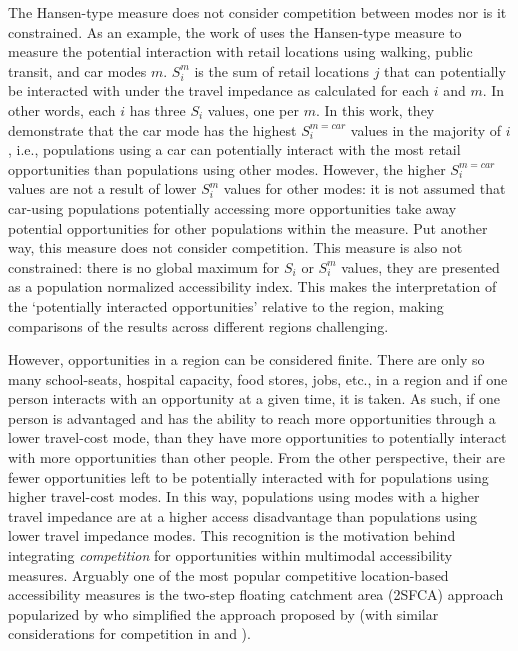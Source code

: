 \documentclass[numbered]{trbunofficial}
\begin{document}
The Hansen-type measure does not consider competition between modes nor
is it constrained. As an example, the work of
\citet{tahmasbiMultimodalAccessibilitybasedEquity2019} uses the
Hansen-type measure to measure the potential interaction with retail
locations using walking, public transit, and car modes \(m\). \(S_i^m\)
is the sum of retail locations \(j\) that can potentially be interacted
with under the travel impedance as calculated for each \(i\) and \(m\).
In other words, each \(i\) has three \(S_i\) values, one per \(m\). In
this work, they demonstrate that the car mode has the highest
\(S_i^{m=car}\) values in the majority of \(i\), i.e., populations using
a car can potentially interact with the most retail opportunities than
populations using other modes. However, the higher \(S_i^{m=car}\)
values are not a result of lower \(S_i^{m}\) values for other modes: it
is not assumed that car-using populations potentially accessing more
opportunities take away potential opportunities for other populations
within the measure. Put another way, this measure does not consider
competition. This measure is also not constrained: there is no global
maximum for \(S_i\) or \(S_i^m\) values, they are presented as a
population normalized accessibility index. This makes the interpretation
of the `potentially interacted opportunities' relative to the region,
making comparisons of the results across different regions challenging.

However, opportunities in a region can be considered finite. There are
only so many school-seats, hospital capacity, food stores, jobs, etc.,
in a region and if one person interacts with an opportunity at a given
time, it is taken. As such, if one person is advantaged and has the
ability to reach more opportunities through a lower travel-cost mode,
than they have more opportunities to potentially interact with more
opportunities than other people. From the other perspective, their are
fewer opportunities left to be potentially interacted with for
populations using higher travel-cost modes. In this way, populations
using modes with a higher travel impedance are at a higher access
disadvantage than populations using lower travel impedance modes. This
recognition is the motivation behind integrating \emph{competition} for
opportunities within multimodal accessibility measures. Arguably one of
the most popular competitive location-based accessibility measures is
the two-step floating catchment area (2SFCA) approach popularized by
\citet{luoMeasuresSpatialAccessibility2003} who simplified the approach
proposed by \citet{shenLocationCharacteristicsInnercity1998} (with
similar considerations for competition in
\citet{weibullAxiomaticApproachMeasurement1976} and
\citet{josephMeasuringPotentialPhysical1982}).
\end{document}

